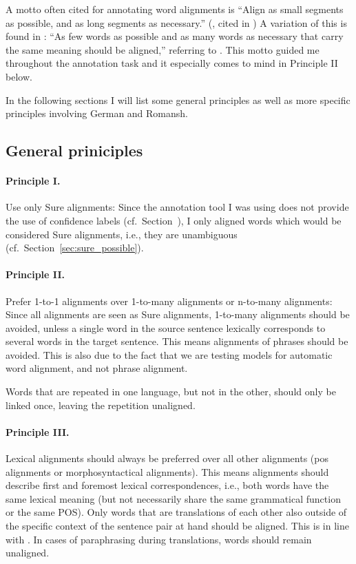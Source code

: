 A motto  often cited for annotating word alignments is \enquote{Align as small segments as possible, and as long segments as necessary.} (\cite{Vronis00evaluationof}, cited in \cite{lines2007}) A variation of this is found in \cite{clematide2018}: \enquote{As few words as possible and as many words as necessary that carry the same meaning should be aligned,} referring to \cite{lambert2005}. This motto  guided me throughout the annotation task and it especially comes to mind in Principle II below.


In the following sections I will list some general principles as well as more specific principles involving German and Romansh.

\subsection{General priniciples}
\label{sec:gold-principles}
\paragraph{Principle I.} 
Use only Sure alignments: 
Since the annotation tool I was using does not provide the use of confidence labels (cf.~Section~), I only aligned words which would be considered Sure alignments, i.e., they are unambiguous (cf.~Section~\ref{sec:sure_possible}). 


\paragraph{Principle II.}
Prefer 1-to-1 alignments over 1-to-many alignments or n-to-many alignments: 
Since all alignments are seen as Sure alignments, 1-to-many alignments should be avoided, unless a single word in the source sentence lexically corresponds to several words in the target sentence. %
This means alignments of phrases should be avoided. This is also due to the fact that we are testing models for automatic word alignment, and not phrase alignment.

Words that are repeated in one language, but not in the other, should only be linked once, leaving the repetition unaligned.

\paragraph{Principle III.}
Lexical alignments should always be preferred over all other alignments (\acrfull{pos} alignments or morphosyntactical alignments). 
This means alignments should describe first and foremost lexical correspondences, i.e., both words have the same lexical meaning (but not necessarily share the same grammatical function or the same POS).
Only words that are translations of each other also outside of the specific context of the sentence pair at hand should be aligned. This is in line with \cite{clematide2018}.
In cases of paraphrasing during translations, words should remain unaligned. %

